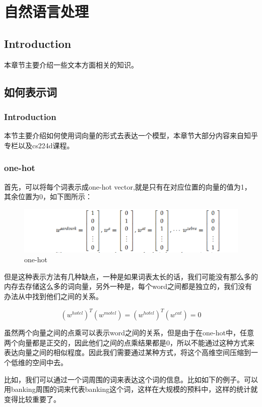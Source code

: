\chapter{自然语言处理}

\section*{Introduction}
	本章节主要介绍一些文本方面相关的知识。
	

\section{如何表示词}
	\subsection*{Introduction}
	本节主要介绍如何使用词向量的形式去表达一个模型，本章节大部分内容来自知乎专栏以及cs224d课程。
	
	\subsection{one-hot}
	首先，可以将每个词表示成one-hot vector,就是只有在对应位置的向量的值为1，其余位置为0，如下图所示：
	

	\begin{figure}[htbp]
	\centering\includegraphics[width=6in]{img/6-1.png}
	\caption{one-hot}\label{fig:6-1}
	\end{figure}
	
	但是这种表示方法有几种缺点，一种是如果词表太长的话，我们可能没有那么多的内存去存储这么多的词向量，另外一种是，每个word之间都是独立的，我们没有办法从中找到他们之间的关系。
	
	\begin{equation}
	(w^{hotel})^{T}(w^{motel}) = (w^{hotel})^{T}(w^{cat})=0
	\end{equation}
	
	虽然两个向量之间的点乘可以表示word之间的关系，但是由于在one-hot中，任意两个向量都是正交的，因此他们之间的点乘结果都是0，所以不能通过这种方式来表达向量之间的相似程度。因此我们需要通过某种方式，将这个高维空间压缩到一个低维的空间中去。	
	
	比如，我们可以通过一个词周围的词来表达这个词的信息。比如如下的例子。可以用banking周围的词来代表banking这个词，这样在大规模的预料中，这样的统计就变得比较重要了。
	
